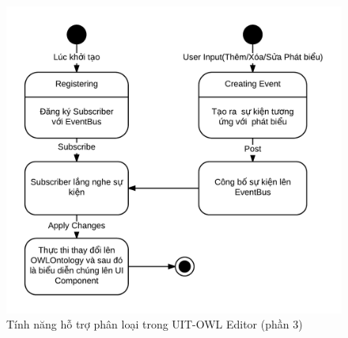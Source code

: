 \begin{figure}[h!]
	\centering
	\includegraphics[width=130mm]{Figures/uml_statechart_eventbus_nobackground.png}
	\caption{Tính năng hỗ trợ phân loại trong UIT-OWL Editor (phần 3)\label{overflow}}
\end{figure}
